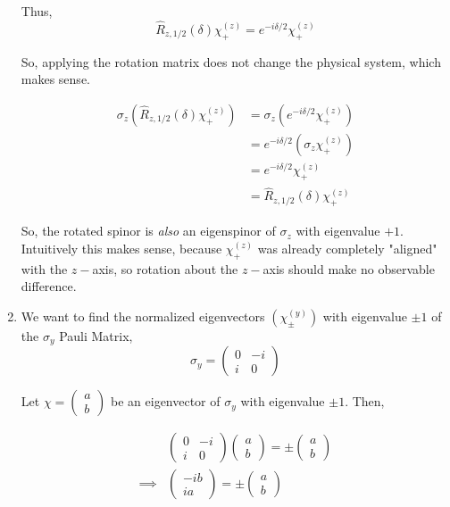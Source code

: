 \documentclass{article}
\begin{document}
\begin{enumerate}[label=(\alph*)]
  Thus, 
  \[ \boxed{\hat{R}_{z, 1/2}(\delta) \chi_+^{(z)} = e^{- i\delta /2} \chi_+^{(z)} }  \]

  So, applying the rotation matrix does not change the physical system, which makes sense. 

  \begin{align*}
    \sigma_z \left( \hat{R}_{z, 1/2}(\delta) \chi_+^{(z)} \right) &= \sigma_z \left( e^{- i\delta /2} \chi_+^{(z)} \right) \\
    &= e^{-i\delta /2} \left( \sigma_z \chi_+^{(z)} \right) \\
    &= e^{- i\delta /2} \chi_+^{(z)} \\
    &= \hat{R}_{z, 1/2}(\delta) \chi_+^{(z)}
  \end{align*}

  So, the rotated spinor is \emph{also} an eigenspinor of $\sigma_z$ with eigenvalue $+1$. Intuitively this makes sense, because $\chi_+^{(z)}$ was already completely "aligned" with the $z-$axis, so rotation about the $z-$axis should make no observable difference.

  \vskip 0.5cm
  \item We want to find the normalized eigenvectors $(\chi_{\pm}^{(y)})$ with eigenvalue $\pm 1$ of the $\sigma_y$ Pauli Matrix,
  \[ \sigma_y = \begin{pmatrix}
    0 & -i \\
    i & 0
  \end{pmatrix} \]

  Let $\chi = \begin{pmatrix}
    a \\ b
  \end{pmatrix}$ be an eigenvector of $\sigma_y$ with eigenvalue $\pm 1$. Then,

  \begin{align*}
    &\begin{pmatrix}
      0 & -i \\
      i & 0
    \end{pmatrix} \begin{pmatrix}
      a \\ b
    \end{pmatrix} = \pm \begin{pmatrix}
      a \\ b
    \end{pmatrix} \\
    \implies &\begin{pmatrix}
      -ib \\
      ia 
    \end{pmatrix} = \pm \begin{pmatrix}
      a \\ b
    \end{pmatrix}
  \end{align*}


\end{enumerate}
\end{document}
